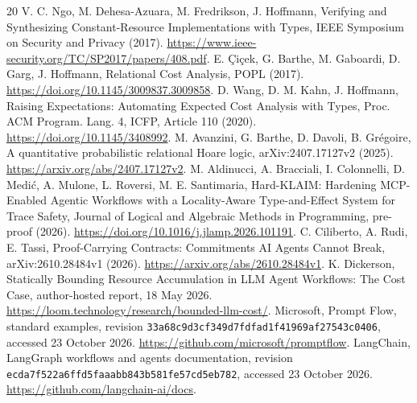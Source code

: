 \begin{thebibliography}{20}
 V. C. Ngo, M. Dehesa-Azuara, M. Fredrikson, J. Hoffmann,
Verifying and Synthesizing Constant-Resource Implementations with Types,
IEEE Symposium on Security and Privacy (2017).
\url{https://www.ieee-security.org/TC/SP2017/papers/408.pdf}.
 E. \c{C}i\c{c}ek, G. Barthe, M. Gaboardi, D. Garg, J. Hoffmann,
Relational Cost Analysis, POPL (2017). \url{https://doi.org/10.1145/3009837.3009858}.
 D. Wang, D. M. Kahn, J. Hoffmann, Raising Expectations:
Automating Expected Cost Analysis with Types, Proc. ACM Program. Lang. 4,
ICFP, Article 110 (2020). \url{https://doi.org/10.1145/3408992}.
 M. Avanzini, G. Barthe, D. Davoli, B. Gr\'egoire,
A quantitative probabilistic relational Hoare logic, arXiv:2407.17127v2 (2025).
\url{https://arxiv.org/abs/2407.17127v2}.
 M. Aldinucci, A. Bracciali, I. Colonnelli, D. Medi\'c,
A. Mulone, L. Roversi, M. E. Santimaria, Hard-KLAIM: Hardening MCP-Enabled
Agentic Workflows with a Locality-Aware Type-and-Effect System for Trace Safety,
Journal of Logical and Algebraic Methods in Programming, pre-proof (2026).
\url{https://doi.org/10.1016/j.jlamp.2026.101191}.
 C. Ciliberto, A. Rudi, E. Tassi, Proof-Carrying Contracts:
Commitments AI Agents Cannot Break, arXiv:2610.28484v1 (2026).
\url{https://arxiv.org/abs/2610.28484v1}.
 K. Dickerson, Statically Bounding Resource Accumulation in LLM
Agent Workflows: The Cost Case, author-hosted report, 18 May 2026.
\url{https://loom.technology/research/bounded-llm-cost/}.
 Microsoft, Prompt Flow, standard examples, revision
\nolinkurl{33a68c9d3cf349d7fdfad1f41969af27543c0406}, accessed 23 October 2026.
\url{https://github.com/microsoft/promptflow}.
 LangChain, LangGraph workflows and agents documentation,
revision \nolinkurl{ecda7f522a6ffd5faaabb843b581fe57cd5eb782}, accessed 23 October 2026.
\url{https://github.com/langchain-ai/docs}.

\end{thebibliography}

